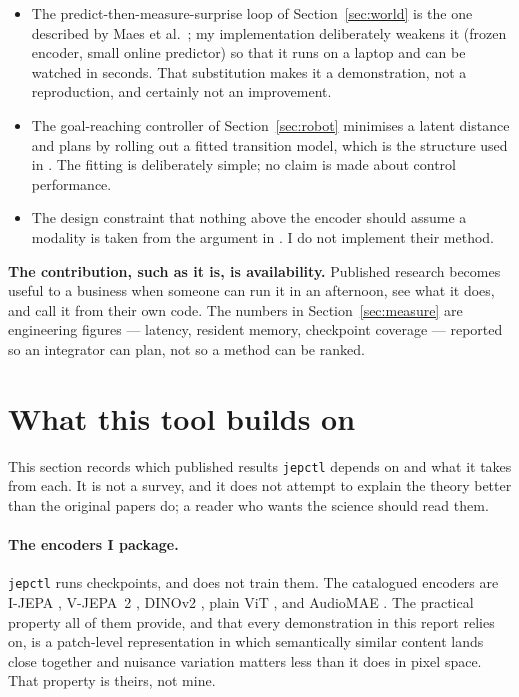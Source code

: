\documentclass[11pt,onecolumn]{article}
\newcommand{\jepctl}{\texttt{jepctl}}
\begin{document}
\begin{itemize}
  \item The predict-then-measure-surprise loop of Section~\ref{sec:world} is the one
  described by Maes et al.\ \cite{lewm2026}; my implementation deliberately weakens it
  (frozen encoder, small online predictor) so that it runs on a laptop and can be watched
  in seconds. That substitution makes it a demonstration, not a reproduction, and
  certainly not an improvement.
  \item The goal-reaching controller of Section~\ref{sec:robot} minimises a latent
  distance and plans by rolling out a fitted transition model, which is the structure used
  in \cite{lewm2026}. The fitting is deliberately simple; no claim is made about control
  performance.
  \item The design constraint that nothing above the encoder should assume a modality is
  taken from the argument in \cite{jepaanything2026}. I do not implement their method.
\end{itemize}

\textbf{The contribution, such as it is, is availability.} Published research becomes
useful to a business when someone can run it in an afternoon, see what it does, and call
it from their own code. The numbers in Section~\ref{sec:measure} are engineering figures
--- latency, resident memory, checkpoint coverage --- reported so an integrator can plan,
not so a method can be ranked.

\section{What this tool builds on}

This section records which published results \jepctl{} depends on and what it takes from
each. It is not a survey, and it does not attempt to explain the theory better than the
original papers do; a reader who wants the science should read them.

\paragraph{The encoders I package.}
\jepctl{} runs checkpoints, and does not train them. The catalogued encoders are I-JEPA
\cite{ijepa2023}, V-JEPA~2 \cite{vjepa2_2025}, DINOv2 \cite{dinov2_2023}, plain ViT
\cite{vit2021}, and AudioMAE \cite{audiomae2022}. The practical property all of them
provide, and that every demonstration in this report relies on, is a patch-level
representation in which semantically similar content lands close together and nuisance
variation matters less than it does in pixel space. That property is theirs, not mine.
\end{document}
